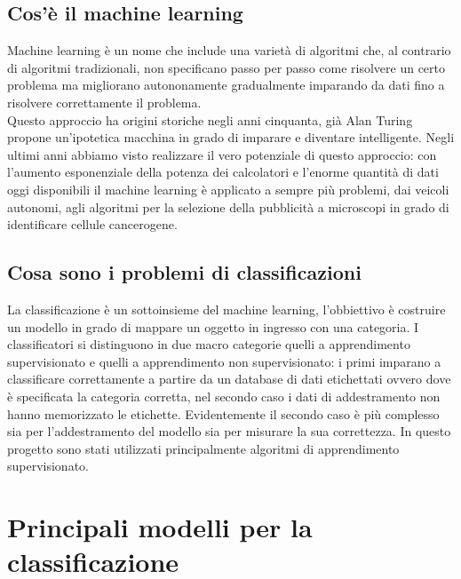 \documentclass[a4paper,12pt]{report}
\begin{document}
\section{Cos'è il machine learning} %
Machine learning è un nome che include una varietà di algoritmi che, al contrario
di algoritmi tradizionali, non specificano passo per passo come risolvere un
certo problema ma migliorano autononamente gradualmente imparando da dati fino a 
risolvere correttamente il problema. \\
Questo approccio ha origini storiche negli anni cinquanta, già Alan Turing  %
propone un'ipotetica macchina in grado di imparare e diventare intelligente. Negli 
ultimi anni abbiamo visto realizzare il vero potenziale di questo approccio:
con l'aumento esponenziale della potenza dei calcolatori e l'enorme quantità di dati
oggi disponibili il machine learning è applicato a sempre più problemi, dai veicoli 
autonomi, agli algoritmi per la selezione della pubblicità a microscopi in grado di 
identificare cellule cancerogene.

\section{Cosa sono i problemi di classificazioni}

La classificazione è un sottoinsieme del machine learning, l'obbiettivo è costruire un 
modello in grado di mappare un oggetto in ingresso con una categoria. I classificatori 
si distinguono in due macro categorie quelli a apprendimento supervisionato e quelli a
apprendimento non supervisionato: i primi imparano a classificare correttamente a 
partire da un database di dati etichettati ovvero dove è specificata la categoria 
corretta, nel secondo caso i dati di addestramento non hanno memorizzato le etichette.
Evidentemente il secondo caso è più complesso sia per l'addestramento del modello sia 
per misurare la sua correttezza. In questo progetto sono stati utilizzati principalmente
algoritmi di apprendimento supervisionato.


\chapter{Principali modelli per la classificazione}
\end{document}
